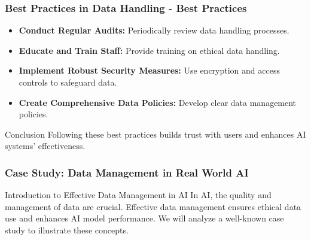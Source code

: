 \documentclass[aspectratio=169]{beamer}
\begin{document}
\begin{frame}[fragile]
    \frametitle{Best Practices in Data Handling - Best Practices}
    \begin{itemize}
        \item \textbf{Conduct Regular Audits:} Periodically review data handling processes.
        \item \textbf{Educate and Train Staff:} Provide training on ethical data handling.
        \item \textbf{Implement Robust Security Measures:} Use encryption and access controls to safeguard data.
        \item \textbf{Create Comprehensive Data Policies:} Develop clear data management policies.
    \end{itemize}
    \begin{block}{Conclusion}
        Following these best practices builds trust with users and enhances AI systems' effectiveness.
    \end{block}
\end{frame}

\begin{frame}[fragile]
    \frametitle{Case Study: Data Management in Real World AI}
    \begin{block}{Introduction to Effective Data Management in AI}
        In AI, the quality and management of data are crucial. Effective data management ensures ethical data use and enhances AI model performance. We will analyze a well-known case study to illustrate these concepts.
    \end{block}
\end{frame}
\end{document}
